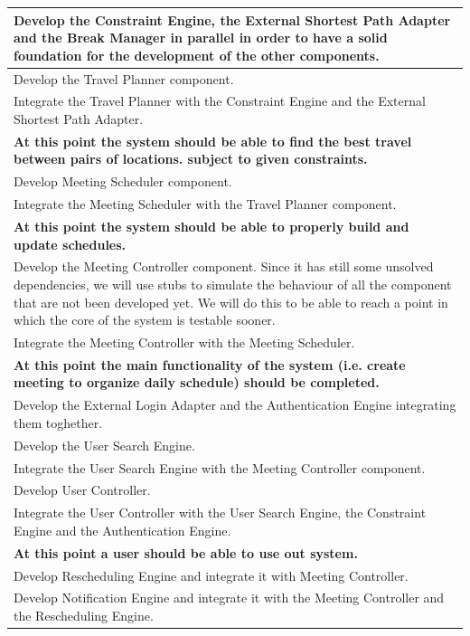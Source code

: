 \begin{longtable}{|m{16cm}|}
	\hline Develop the Constraint Engine, the External Shortest Path Adapter and the Break Manager in parallel in order to have a solid foundation for the development of the other components.
	\\ \hline Develop the Travel Planner component.
	\\ \hline Integrate the Travel Planner with the Constraint Engine and the External Shortest Path Adapter.
	\\ \hline
	\textbf{At this point the system should be able to find the best travel between pairs of locations. subject to given constraints.}
	\\ \hline Develop Meeting Scheduler component. 
	\\ \hline Integrate the Meeting Scheduler with the Travel Planner component.
	\\ \hline
	\textbf{At this point the system should be able to properly build and update schedules.}
	\\ \hline Develop the Meeting Controller component. Since it has still some unsolved dependencies, we will use stubs to simulate the behaviour of all the component that are not been developed yet. We will do this to be able to reach a point in which the core of the system is testable sooner.
	\\ \hline Integrate the Meeting Controller with the Meeting Scheduler.
	\\ \hline
	\textbf{At this point the main functionality of the system (i.e. create meeting to organize daily schedule) should be completed.}
	\\ \hline Develop the External Login Adapter and the Authentication Engine integrating them toghether.
	\\ \hline Develop the User Search Engine.
	\\ \hline Integrate the User Search Engine with the Meeting Controller component.
	\\ \hline Develop User Controller.
	\\ \hline Integrate the User Controller with the User Search Engine, the Constraint Engine and the Authentication Engine.
	\\ \hline
	\textbf{At this point a user should be able to use out system.}
	\\ \hline Develop Rescheduling Engine and integrate it with Meeting Controller.
	\\ \hline Develop Notification Engine and integrate it with the Meeting Controller and the Rescheduling Engine.

\end{longtable}
